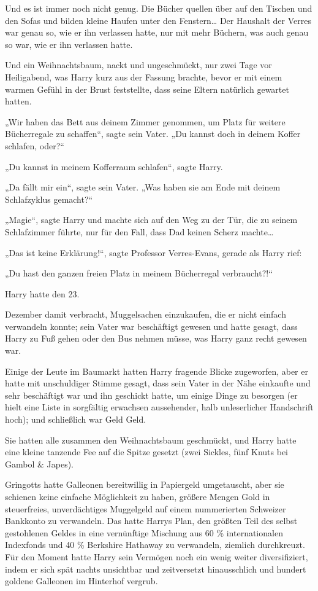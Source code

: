 {Und es ist immer noch nicht genug. Die Bücher quellen über auf den Tischen und den Sofas und bilden kleine Haufen unter den Fenstern… Der Haushalt der Verres war genau so, wie er ihn verlassen hatte, nur mit mehr Büchern, was auch genau so war, wie er ihn verlassen hatte.

Und ein Weihnachtsbaum, nackt und ungeschmückt, nur zwei Tage vor Heiligabend, was Harry kurz aus der Fassung brachte, bevor er mit einem warmen Gefühl in der Brust feststellte, dass seine Eltern natürlich gewartet hatten.

„Wir haben das Bett aus deinem Zimmer genommen, um Platz für weitere Bücherregale zu schaffen“, sagte sein Vater. „Du kannst doch in deinem Koffer schlafen, oder?“

„Du kannst in meinem Kofferraum schlafen“, sagte Harry.

„Da fällt mir ein“, sagte sein Vater. „Was haben sie am Ende mit deinem Schlafzyklus gemacht?“

„Magie“, sagte Harry und machte sich auf den Weg zu der Tür, die zu seinem Schlafzimmer führte, nur für den Fall, dass Dad keinen Scherz machte…

„Das ist keine Erklärung!“, sagte Professor Verres-Evans, gerade als Harry rief:

„Du hast den ganzen freien Platz in meinem Bücherregal verbraucht?!“

Harry hatte den 23.

Dezember damit verbracht, Muggelsachen einzukaufen, die er nicht einfach verwandeln konnte; sein Vater war beschäftigt gewesen und hatte gesagt, dass Harry zu Fuß gehen oder den Bus nehmen müsse, was Harry ganz recht gewesen war.

Einige der Leute im Baumarkt hatten Harry fragende Blicke zugeworfen, aber er hatte mit unschuldiger Stimme gesagt, dass sein Vater in der Nähe einkaufte und sehr beschäftigt war und ihn geschickt hatte, um einige Dinge zu besorgen (er hielt eine Liste in sorgfältig erwachsen aussehender, halb unleserlicher Handschrift hoch); und schließlich war Geld Geld.

Sie hatten alle zusammen den Weihnachtsbaum geschmückt, und Harry hatte eine kleine tanzende Fee auf die Spitze gesetzt (zwei Sickles, fünf Knuts bei Gambol \& Japes).

Gringotts hatte Galleonen bereitwillig in Papiergeld umgetauscht, aber sie schienen keine einfache Möglichkeit zu haben, größere Mengen Gold in steuerfreies, unverdächtiges Muggelgeld auf einem nummerierten Schweizer Bankkonto zu verwandeln. Das hatte Harrys Plan, den größten Teil des selbst gestohlenen Geldes in eine vernünftige Mischung aus 60 \% internationalen Indexfonds und 40 \% Berkshire Hathaway zu verwandeln, ziemlich durchkreuzt. Für den Moment hatte Harry sein Vermögen noch ein wenig weiter diversifiziert, indem er sich spät nachts unsichtbar und zeitversetzt hinausschlich und hundert goldene Galleonen im Hinterhof vergrub.

}
